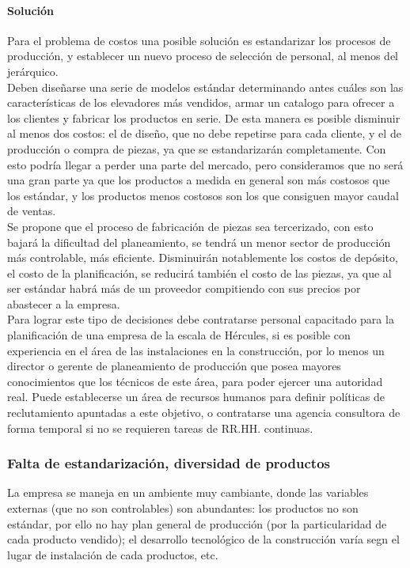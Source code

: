 \documentclass[12pt,a4paper,spanish]{article}
\begin{document}
\paragraph{Soluci\'on}
Para el problema de costos una posible soluci\'on es estandarizar los procesos de producci\'on, y establecer un nuevo proceso de selecci\'on de personal, al menos del jer\'arquico.\\
Deben dise\~narse una serie de modelos est\'andar determinando antes cu\'ales son las caracter\'isticas de los elevadores m\'as vendidos, armar un catalogo para ofrecer a los clientes y fabricar los productos en serie. De esta manera es posible disminuir al menos dos costos: el de dise\~no, que no debe repetirse para cada cliente, y el de producci\'on o compra de piezas, ya que se estandarizar\'an completamente. Con esto podr\'ia llegar a perder una parte del mercado, pero consideramos que no ser\'{a} una gran parte ya que los productos a medida en general son m\'as costosos que los est\'andar, y los productos menos costosos son los que consiguen mayor caudal de ventas.\\
Se propone que el proceso de fabricaci\'on de piezas sea tercerizado, con esto bajar\'a la dificultad del planeamiento, se tendr\'{a} un menor sector de producci\'on m\'{a}s controlable, m\'as eficiente. Disminuir\'an notablemente los costos de dep\'osito, el costo de la planificaci\'on, se reducir\'a tambi\'en el costo de las piezas, ya que al ser est\'andar habr\'a m\'as de un proveedor compitiendo con sus precios por abastecer a la empresa.\\
Para lograr este tipo de decisiones debe contratarse personal capacitado para la planificaci\'on de una empresa de la escala de H\'ercules, si es posible con experiencia en el \'area de las instalaciones en la construcci\'on, por lo menos un director o gerente de planeamiento de producci\'on que posea mayores conocimientos que los t\'ecnicos de este \'area, para poder ejercer una autoridad real. Puede establecerse un \'area de recursos humanos para definir pol\'iticas de reclutamiento apuntadas a este objetivo, o contratarse una agencia consultora de forma temporal si no se requieren tareas de RR.HH. continuas.

\subsubsection{Falta de estandarizaci\'on, diversidad de productos}
La empresa se maneja en un ambiente muy cambiante, donde las variables externas (que no son controlables) son abundantes: los productos no son est\'andar, por ello no hay plan general de producci\'on (por la particularidad de cada producto vendido); el desarrollo tecnol\'ogico de la construcci\'on var\'ia segn el lugar de instalaci\'on de cada productos, etc.
\end{document}
